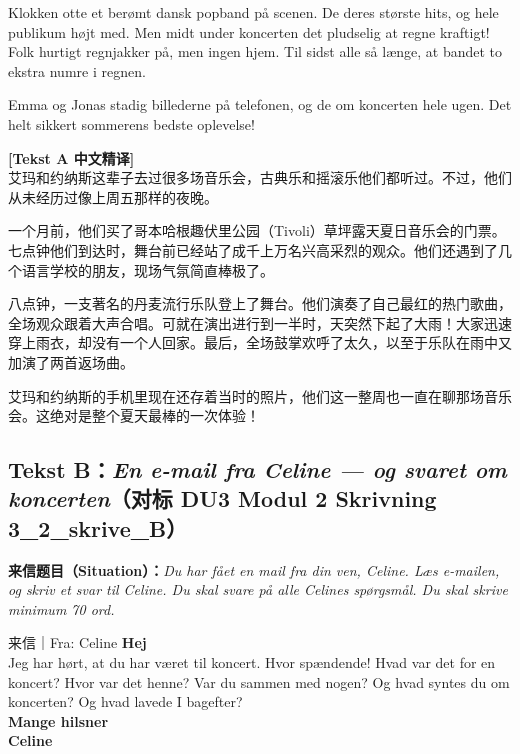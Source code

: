 Klokken otte  et berømt dansk popband på scenen. De  deres største hits, og hele publikum  højt med. Men midt under koncerten  det pludselig at regne kraftigt! Folk  hurtigt regnjakker på, men ingen  hjem. Til sidst  alle så længe, at bandet  to ekstra numre i regnen.

Emma og Jonas  stadig billederne på telefonen, og de  om koncerten hele ugen. Det  helt sikkert  sommerens bedste oplevelse!

\begin{transbox}
\small
\textbf{\color{NCDTeal}[Tekst A 中文精译]}\\
艾玛和约纳斯这辈子去过很多场音乐会，古典乐和摇滚乐他们都听过。不过，他们从未经历过像上周五那样的夜晚。

一个月前，他们买了哥本哈根趣伏里公园（Tivoli）草坪露天夏日音乐会的门票。七点钟他们到达时，舞台前已经站了成千上万名兴高采烈的观众。他们还遇到了几个语言学校的朋友，现场气氛简直棒极了。

八点钟，一支著名的丹麦流行乐队登上了舞台。他们演奏了自己最红的热门歌曲，全场观众跟着大声合唱。可就在演出进行到一半时，天突然下起了大雨！大家迅速穿上雨衣，却没有一个人回家。最后，全场鼓掌欢呼了太久，以至于乐队在雨中又加演了两首返场曲。

艾玛和约纳斯的手机里现在还存着当时的照片，他们这一整周也一直在聊那场音乐会。这绝对是整个夏天最棒的一次体验！
\end{transbox}

\subsection*{Tekst B：\textit{En e-mail fra Celine --- og svaret om koncerten}（对标 DU3 Modul 2 Skrivning 3\_2\_skrive\_B）}

\textbf{来信题目（Situation）：}\textit{Du har fået en mail fra din ven, Celine. Læs e-mailen, og skriv et svar til Celine. Du skal svare på alle Celines spørgsmål. Du skal skrive minimum 70 ord.}

\begin{emailbox}{来信｜Fra: Celine}
\textbf{Hej}\\
Jeg har hørt, at du har været til koncert. Hvor spændende! Hvad var det for en koncert? Hvor var det henne? Var du sammen med nogen? Og hvad syntes du om koncerten? Og hvad lavede I bagefter?\\
\textbf{Mange hilsner}\\
\textbf{Celine}
\end{emailbox}

